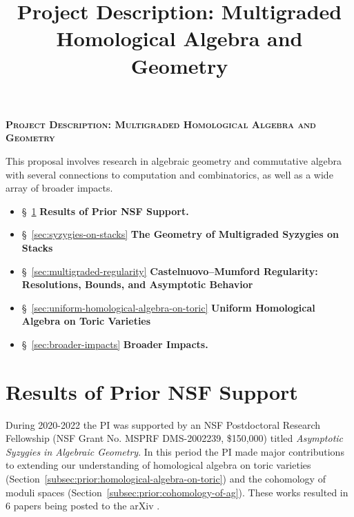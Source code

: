 \documentclass[11pt,reqno]{amsart}
\title{Project Description: Multigraded Homological Algebra and Geometry}
\theoremstyle{remark}
\begin{document}
 
\thispagestyle{empty}
\pagestyle{empty}
\begingroup  
  \centering
  \large\scshape\bfseries Project Description: Multigraded Homological Algebra and Geometry\\[1em]
\endgroup


\setcounter{section}{0}

\noindent This proposal involves research in algebraic geometry and commutative algebra with several connections to computation and combinatorics, as well as a wide array of broader impacts.
\begin{itemize}[leftmargin=*]
	\item \S~\ref{sec:prior-work} \textbf{Results of Prior NSF Support.} 
	\item \S~\ref{sec:syzygies-on-stacks} \textbf{The Geometry of Multigraded Syzygies on Stacks}
	\item \S~\ref{sec:multigraded-regularity} \textbf{Castelnuovo–Mumford Regularity: Resolutions, Bounds, and Asymptotic Behavior}
	\item \S~\ref{sec:uniform-homological-algebra-on-toric} \textbf{Uniform Homological Algebra on Toric Varieties}
	\item \S~\ref{sec:broader-impacts} \textbf{Broader Impacts.}
\end{itemize}

\section{Results of Prior NSF Support}\label{sec:prior-work}

During 2020-2022 the PI was supported by an NSF Postdoctoral Research Fellowship (NSF Grant No. MSPRF DMS-2002239, \$150,000) titled \textit{Asymptotic Syzygies in Algebraic Geometry}. In this period the PI made major contributions to extending our understanding of homological algebra on toric varieties (Section~\ref{subsec:prior:homological-algebra-on-toric}) and the cohomology of moduli spaces (Section~\ref{subsec:prior:cohomology-of-ag}). These works resulted in 6 papers being posted to the arXiv \cite{BCEGLY22,bruceHellerSayrafi21,bruceHellerSayrafi22,brandtBruceCorey23,BBCMMW24,ABBCV25}.
\end{document}
